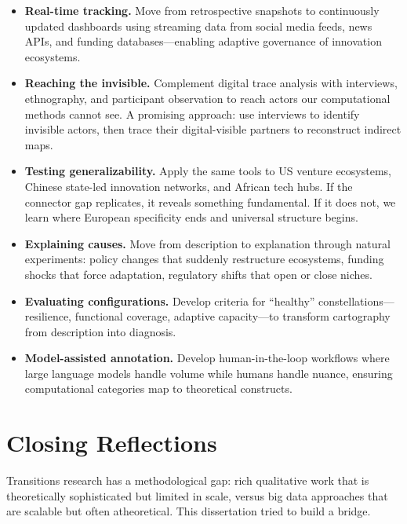 \documentclass[../main.tex]{subfiles}
\begin{document}
\begin{itemize}[leftmargin=*, itemsep=0.4em]
\item \textbf{Real-time tracking.} Move from retrospective snapshots to continuously updated dashboards using streaming data from social media feeds, news APIs, and funding databases---enabling adaptive governance of innovation ecosystems.

\item \textbf{Reaching the invisible.} Complement digital trace analysis with interviews, ethnography, and participant observation to reach actors our computational methods cannot see. A promising approach: use interviews to identify invisible actors, then trace their digital-visible partners to reconstruct indirect maps.

\item \textbf{Testing generalizability.} Apply the same tools to US venture ecosystems, Chinese state-led innovation networks, and African tech hubs. If the connector gap replicates, it reveals something fundamental. If it does not, we learn where European specificity ends and universal structure begins.

\item \textbf{Explaining causes.} Move from description to explanation through natural experiments: policy changes that suddenly restructure ecosystems, funding shocks that force adaptation, regulatory shifts that open or close niches.

\item \textbf{Evaluating configurations.} Develop criteria for ``healthy'' constellations---resilience, functional coverage, adaptive capacity---to transform cartography from description into diagnosis.

\item \textbf{Model-assisted annotation.} Develop human-in-the-loop workflows where large language models handle volume while humans handle nuance, ensuring computational categories map to theoretical constructs.
\end{itemize}

\section{Closing Reflections}

Transitions research has a methodological gap: rich qualitative work that is theoretically sophisticated but limited in scale, versus big data approaches that are scalable but often atheoretical. This dissertation tried to build a bridge.
\end{document}
